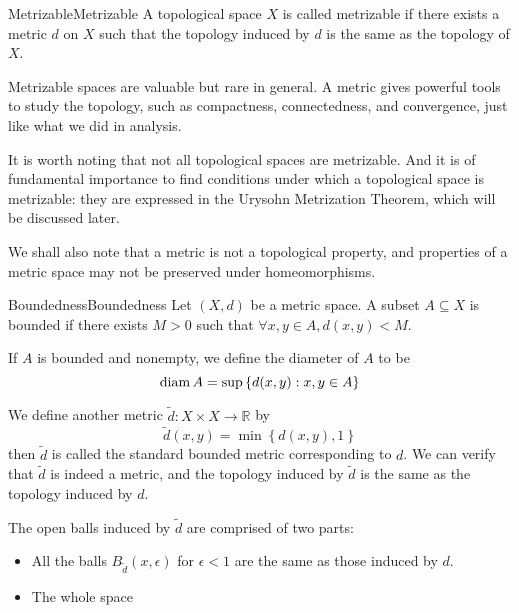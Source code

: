 \documentclass[../main.tex]{subfiles}
\begin{document}
\begin{definition}{Metrizable}{Metrizable}
A topological space $X$ is called metrizable if there exists a metric $d$ on $X$ such that the topology induced by $d$ is the same as the topology of $X$.
\end{definition}

\begin{remark}
	Metrizable spaces are valuable but rare in general. A metric gives powerful tools to study the topology, such as compactness, connectedness, and convergence, just like what we did in analysis.

	It is worth noting that not all topological spaces are metrizable. And it is of fundamental importance to find conditions under which a topological space is metrizable: they are expressed in the Urysohn Metrization Theorem, which will be discussed later.

	We shall also note that a metric is not a topological property, and properties of a metric space may not be preserved under homeomorphisms.
\end{remark}

\begin{definition}{Boundedness}{Boundedness}
Let $(X,d)$ be a metric space. A subset $A \subseteq X$ is bounded if there exists $M>0$ such that $\forall x,y\in A, d(x,y) < M$.

If $A$ is bounded and nonempty, we define the diameter of $A$ to be
\begin{equation*}
	\operatorname{diam} A = \sup \left\{ d(x,y): x,y\in A \right\}
\end{equation*}

We define another metric $\tilde{d}: X \times X \rightarrow \mathbb{R}$ by
\begin{equation*}
\tilde{d}(x,y) = \min \left\{ d(x,y),1 \right\}
\end{equation*}
then $\tilde{d}$ is called the standard bounded metric corresponding to $d$. We can verify that $\tilde{d}$ is indeed a metric, and the topology induced by $\tilde{d}$ is the same as the topology induced by $d$.
\end{definition}

The open balls induced by $\tilde{d}$ are comprised of two parts:
\begin{itemize}
	\item All the balls $B_{\tilde{d}}(x,\epsilon)$ for $\epsilon < 1$ are the same as those induced by $d$.
	\item The whole space
\end{itemize}
\end{document}
